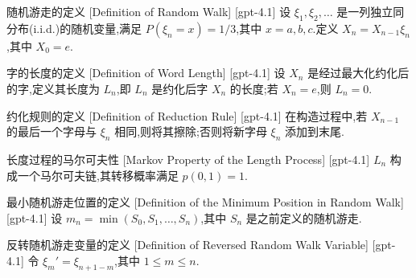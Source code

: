 \documentclass[UTF8]{ctexart}
\begin{document}
    
    
    \begin{dfn}
        {随机游走的定义}
        [Definition of Random Walk]
        [gpt-4.1]
        设 $\xi_{1}, \xi_{2}, \ldots$ 是一列独立同分布(i.i.d.)的随机变量,满足 $P(\xi_{n} = x) = 1/3$,其中 $x = a, b, c$.定义 $X_{n} = X_{n-1} \xi_{n}$,其中 $X_{0} = e$.
    \end{dfn}
    
    
    
    \begin{dfn}
        {字的长度的定义}
        [Definition of Word Length]
        [gpt-4.1]
        设 $X_{n}$ 是经过最大化约化后的字,定义其长度为 $L_{n}$,即 $L_{n}$ 是约化后字 $X_{n}$ 的长度;若 $X_{n} = e$,则 $L_{n} = 0$.
    \end{dfn}
    
    
    
    \begin{dfn}
        {约化规则的定义}
        [Definition of Reduction Rule]
        [gpt-4.1]
        在构造过程中,若 $X_{n-1}$ 的最后一个字母与 $\xi_{n}$ 相同,则将其擦除;否则将新字母 $\xi_{n}$ 添加到末尾.
    \end{dfn}
    
    
    
    \begin{ppt}
        {长度过程的马尔可夫性}
        [Markov Property of the Length Process]
        [gpt-4.1]
        $L_{n}$ 构成一个马尔可夫链,其转移概率满足 $p(0, 1) = 1$.
    \end{ppt}
    
    
    
    \begin{dfn}
        {最小随机游走位置的定义}
        [Definition of the Minimum Position in Random Walk]
        [gpt-4.1]
        设 $m_n = \operatorname*{min}(S_0, S_1, \ldots, S_n)$,其中 $S_n$ 是之前定义的随机游走.
    \end{dfn}
    
    
    
    \begin{dfn}
        {反转随机游走变量的定义}
        [Definition of Reversed Random Walk Variable]
        [gpt-4.1]
        令 $\xi_{m}' = \xi_{n+1-m}$,其中 $1 \leq m \leq n$.
    \end{dfn}
    
\end{document}
